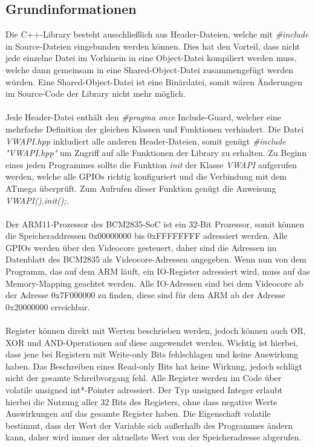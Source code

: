 \documentclass[12pt]{article}
\begin{document}
\subsection{Grundinformationen}
Die C++-Library besteht ausschließlich aus Header-Dateien, welche mit \textit{\#include} in Source-Dateien eingebunden werden können. Dies hat den Vorteil, dass nicht jede einzelne Datei im Vorhinein in eine Object-Datei kompiliert werden muss, welche dann gemeinsam in eine Shared-Object-Datei zusammengefügt werden würden. Eine Shared-Object-Datei ist eine Binärdatei, somit wären Änderungen im Source-Code der Library nicht mehr möglich.
\\\\Jede Header-Datei enthält den \textit{\#pragma once} Include-Guard, welcher eine mehrfache Definition der gleichen Klassen und Funktionen verhindert. Die Datei \textit{VWAPI.hpp} inkludiert alle anderen Header-Dateien, somit genügt \textit{\#include "VWAPI.hpp"} um Zugriff auf alle Funktionen der Library zu erhalten. Zu Beginn eines jeden Programmes sollte die Funktion \textit{init }der Klasse \textit{VWAPI} aufgerufen werden, welche alle GPIOs richtig konfiguriert und die Verbindung mit dem ATmega überprüft. Zum Aufrufen dieser Funktion genügt die Anweisung \textit{VWAPI().init();}.
\\\\Der ARM11-Prozessor des BCM2835-SoC ist ein 32-Bit Prozessor, somit können die Speicheraddressen 0x00000000 bis 0xFFFFFFFF adressiert werden. Alle GPIOs werden über den Videocore gesteuert, daher sind die Adressen im Datenblatt des BCM2835 als Videocore-Adressen angegeben. Wenn nun von dem Programm, das auf dem ARM läuft, ein IO-Register adressiert wird, muss auf das Memory-Mapping geachtet werden. Alle IO-Adressen sind bei dem Videocore ab der Adresse 0x7F000000 zu finden, diese sind für dem ARM ab der Adresse 0x20000000 erreichbar.
\\\\Register können direkt mit Werten beschrieben werden, jedoch können auch OR, XOR und AND-Operationen auf diese angewendet werden. Wichtig ist hierbei, dass jene bei Registern mit Write-only Bits fehlschlagen und keine Auswirkung haben. Das Beschreiben eines Read-only Bits hat keine Wirkung, jedoch schlägt nicht der gesamte Schreibvorgang fehl. Alle Register werden im Code über volatile unsigned int*-Pointer adressiert. Der Typ unsigned Integer erlaubt hierbei die Nutzung aller 32 Bits des Registers, ohne dass negative Werte Auswirkungen auf das gesamte Register haben. Die Eigenschaft volatile bestimmt, dass der Wert der Variable sich außerhalb des Programmes ändern kann, daher wird immer der aktuellste Wert von der Speicheradresse abgerufen.
\end{document}
